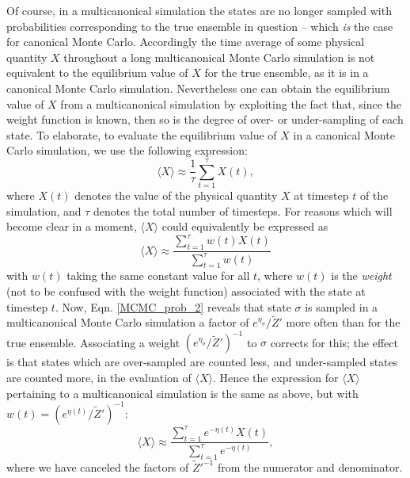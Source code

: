 \documentclass{report}
\begin{document}
Of course, in a multicanonical simulation the states are no longer sampled with probabilities corresponding to the true ensemble in question -- 
which \emph{is} the case for canonical Monte Carlo. Accordingly the time average of some physical quantity $X$ throughout a long multicanonical 
Monte Carlo simulation is not equivalent to the equilibrium value of $X$ for the true ensemble, as it is in a canonical Monte Carlo
simulation. Nevertheless one can obtain the equilibrium value of $X$ from a multicanonical simulation by exploiting the fact that, since the 
weight function is known, then so is the degree of over- or under-sampling of each state. To elaborate, to evaluate the equilibrium value of 
$X$ in a canonical Monte Carlo simulation, we use the following expression:
\begin{equation}
\langle X\rangle\approx\frac{1}{\tau}\sum_{t=1}^{\tau}X(t),
\end{equation}
where $X(t)$ denotes the value of the physical quantity $X$ at timestep $t$ of the simulation, and $\tau$ denotes the total number of timesteps.
For reasons which will become clear in a moment, $\langle X\rangle$ could equivalently be expressed as
\begin{equation}
\langle X\rangle\approx\frac{\displaystyle\sum_{t=1}^{\tau}w(t)X(t)}{\displaystyle\sum_{t=1}^{\tau}w(t)}
\end{equation}
with $w(t)$ taking the same constant value for all $t$, where $w(t)$ is the \emph{weight} (not to be confused with the weight function) associated 
with the state at timestep $t$.
Now, Eqn. \eqref{MCMC_prob_2} reveals that state $\sigma$ is sampled in a multicanonical Monte Carlo simulation a factor of
$e^{\eta_{\sigma}}/\tilde{Z}'$ more often than for the true ensemble. Associating a weight $(e^{\eta_{\sigma}}/\tilde{Z}')^{-1}$ to $\sigma$ corrects for
this; the effect is that states which are over-sampled are counted less, and under-sampled states are counted more, in the evaluation of $\langle X\rangle$.
Hence the expression for $\langle X\rangle$ pertaining to a multicanonical simulation is the same as above, but with $w(t)=(e^{\eta(t)}/\tilde{Z}')^{-1}$:
\begin{equation}\label{equilX_MCMC}
\langle X\rangle\approx\frac{\displaystyle\sum_{t=1}^{\tau}e^{-\eta(t)}X(t)}{\displaystyle\sum_{t=1}^{\tau}e^{-\eta(t)}},
\end{equation}
where we have canceled the factors of $\tilde{Z}'^{-1}$ from the numerator and denominator.
\end{document}
